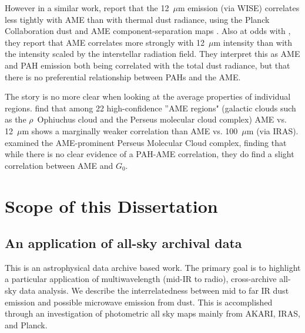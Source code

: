 \begin{center}
          However in a similar work, \cite{hensley16} report that the 12~$\mu$m emission (via WISE) correlates less tightly with AME than with thermal dust radiance, using the Planck Collaboration dust and AME component-separation maps \citep{planck15X}. Also at odds with \cite{ysard10b}, they report that AME correlates more strongly with 12~$\mu$m intensity than with the intensity scaled by the interstellar radiation field. They interpret this as AME and PAH emission both being correlated with the total dust radiance, but that there is no preferential relationship between PAHs and the AME.

         The story is no more clear when looking at the average properties of individual regions. \cite{planckXV} find that among 22 high-confidence ''AME regions" (galactic clouds such as the $\rho$~Ophiuchus cloud and the Perseus molecular cloud complex) AME vs. 12~$\mu$m  shows a marginally weaker correlation than AME vs. 100~$\mu$m (via IRAS). \cite{tibbs11} examined the AME-prominent Perseus Molecular Cloud complex, finding that while there is no clear evidence of a PAH-AME correlation, they do find a slight correlation between AME and  $G_0$.


\section{Scope of this Dissertation}

  \subsection{An application of all-sky archival data}
    This is an astrophysical data archive based work. The primary goal is to highlight a particular application of multiwavelength (mid-IR to radio), cross-archive all-sky data analysis. We describe the interrelatedness between mid to far IR dust emission and possible microwave emission from dust. This is accomplished through an investigation of photometric all sky maps mainly from AKARI, IRAS, and Planck.


\end{center}
